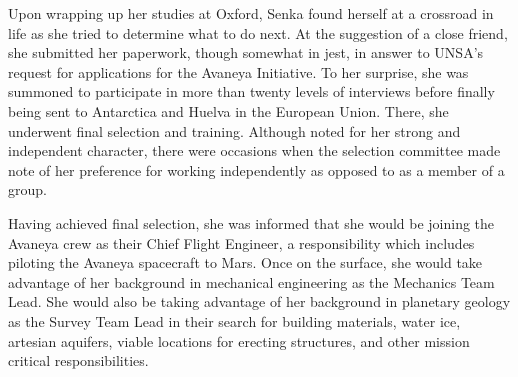 Upon wrapping up her studies at Oxford, Senka found herself at a crossroad in life as she tried to determine what to do next. At the suggestion of a close friend, she submitted her paperwork, though somewhat in jest, in answer to UNSA's request for applications for the Avaneya Initiative. To her surprise, she was summoned to participate in more than twenty levels of interviews before finally being sent to Antarctica and Huelva in the European Union. There, she underwent final selection and training. Although noted for her strong and independent character, there were occasions when the selection committee made note of her preference for working independently as opposed to as a member of a group.

Having achieved final selection, she was informed that she would be joining the Avaneya crew as their Chief Flight Engineer, a responsibility which includes piloting the Avaneya spacecraft to Mars. Once on the surface, she would take advantage of her background in mechanical engineering as the Mechanics Team Lead. She would also be taking advantage of her background in planetary geology as the Survey Team Lead in their search for building materials, water ice, artesian aquifers, viable locations for erecting structures, and other mission critical responsibilities.


